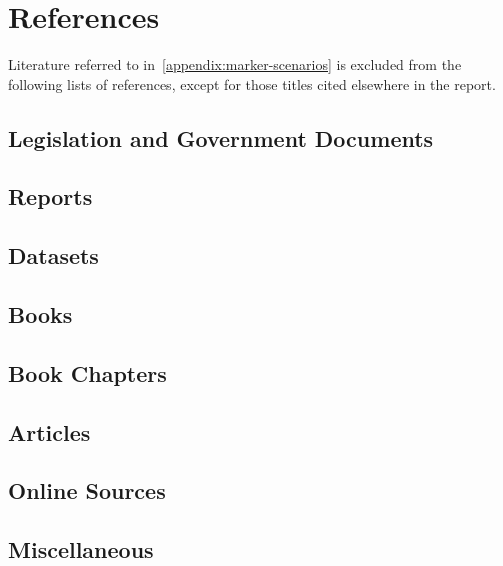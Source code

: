 \chapter{References}\label{chapter:references}
Literature referred to in~\autoref{appendix:marker-scenarios} is excluded from the following lists of references, except for those titles cited elsewhere in the report.

\localtableofcontents

\clearpage
\section{Legislation and Government Documents}
\printbibliography[heading=none, type=legislation]
\clearpage
\section{Reports}
\printbibliography[heading=none, type=report]
\clearpage

\section{Datasets}
\printbibliography[heading=none, type=dataset]
\clearpage

\section{Books}
\printbibliography[heading=none, type=book]
\clearpage

\section{Book Chapters}
\printbibliography[heading=none, type=inbook]
\clearpage

\section{Articles}
\printbibliography[heading=none, type=article]
\clearpage

\section{Online Sources}
\printbibliography[heading=none, type=online]
\clearpage

\section{Miscellaneous}
\printbibliography[heading=none, type=misc]
\clearpage


\chapterEndlines